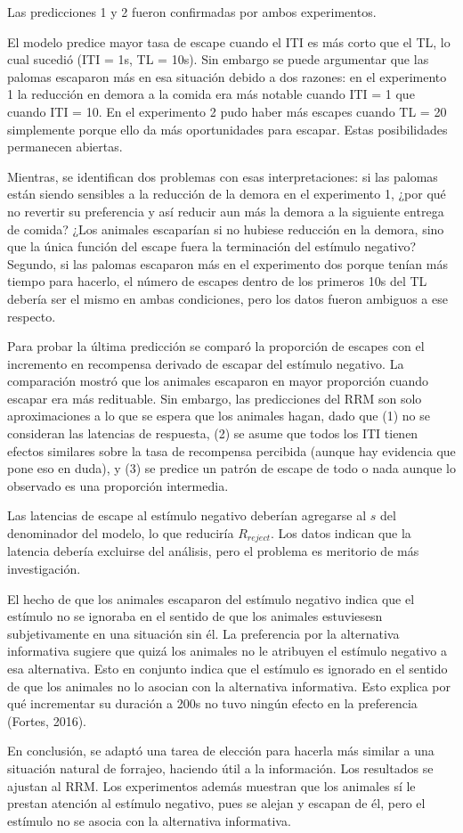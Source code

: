 \documentclass[a4paper,12pt]{article}
\begin{document}
Las predicciones 1 y 2 fueron confirmadas por ambos experimentos.

El modelo predice mayor tasa de escape cuando el ITI es más corto que el TL, lo cual sucedió (ITI = 1s, TL = 10s). Sin embargo se puede argumentar que las palomas escaparon más en esa situación debido a dos razones: en el experimento 1 la reducción en demora a la comida era más notable cuando ITI = 1 que cuando ITI = 10. En el experimento 2 pudo haber más escapes cuando TL = 20 simplemente porque ello da más oportunidades para escapar. Estas posibilidades permanecen abiertas.

Mientras, se identifican dos problemas con esas interpretaciones: si las palomas están siendo sensibles a la reducción de la demora en el experimento 1, ¿por qué no revertir su preferencia y así reducir aun más la demora a la siguiente entrega de comida? ¿Los animales escaparían si no hubiese reducción en la demora, sino que la única función del escape fuera la terminación del estímulo negativo? Segundo, si las palomas escaparon más en el experimento dos porque tenían más tiempo para hacerlo, el número de escapes dentro de los primeros 10s del TL debería ser el mismo en ambas condiciones, pero los datos fueron ambiguos a ese respecto.

Para probar la última predicción se comparó la proporción de escapes con el incremento en recompensa derivado de escapar del estímulo negativo. La comparación mostró que los animales escaparon en mayor proporción cuando escapar era más redituable. Sin embargo, las predicciones del RRM son solo aproximaciones a lo que se espera que los animales hagan, dado que (1) no se consideran las latencias de respuesta, (2) se asume que todos los ITI tienen efectos similares sobre la tasa de recompensa percibida (aunque hay evidencia que pone eso en duda), y (3) se predice un patrón de escape de todo o nada aunque lo observado es una proporción intermedia.

Las latencias de escape al estímulo negativo deberían agregarse al $s$ del denominador del modelo, lo que reduciría $R_{reject}$. Los datos indican que la latencia debería excluirse del análisis, pero el problema es meritorio de más investigación.

El hecho de que los animales escaparon del estímulo negativo indica que el estímulo no se ignoraba en el sentido de que los animales estuviesesn subjetivamente en una situación sin él. La preferencia por la alternativa informativa sugiere que quizá los animales no le atribuyen el estímulo negativo a esa alternativa. Esto en conjunto indica que el estímulo es ignorado en el sentido de que los animales no lo asocian con la alternativa informativa. Esto explica por qué incrementar su duración a 200s no tuvo ningún efecto en la preferencia (Fortes, 2016).

En conclusión, se adaptó una tarea de elección para hacerla más similar a una situación natural de forrajeo, haciendo útil a la información. Los resultados se ajustan al RRM. Los experimentos además muestran que los animales sí le prestan atención al estímulo negativo, pues se alejan y escapan de él, pero el estímulo no se asocia con la alternativa informativa.
\end{document}

